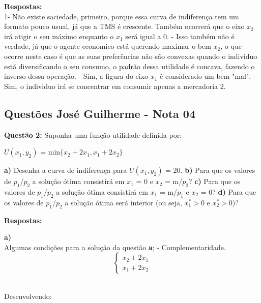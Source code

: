 \begin{flushleft}
\textbf{Respostas:}
\\
1- Não existe saciedade, primeiro, porque essa curva de indiferença tem um formato pouco usual, já que a TMS é crescente. Também ocorrerá que o eixo $x_2$ irá atigir o seu máximo enquanto o $x_1$ será igual a 0.
- Isso também não é verdade, já que o agente economico está querendo maximar o bem $x_2$, o que ocorre neste caso é que as suas preferências não são convexas quando o individuo está diversificando o seu consumo, o padrão dessa utilidade é concava, fazendo o inverso dessa operação.
- Sim, a figura do eixo $x_1$ é considerado um bem "mal".
- Sim, o individuo irá se concentrar em consumir apenas a mercadoria 2.
\singlespacing


\begin{center}
	\section*{Questões José Guilherme - Nota 04}
\end{center}
\singlespacing

\textbf{Questão 2:} Suponha uma função utilidade definida por:

\begin{center}
	$U(x_{1}, y_{2})$ = min$\lbrace{x_{2} + 2x_{1},x_{1} + 2x_{2} }\rbrace$

\end{center}

\textbf{a)} Desenha a curva de indiferença para $U(x_{1}, y_{2})$ = 20.
\singlespacing
\textbf{b)} Para que os valores de $p_{1}$/$p_{2}$ a solução ótima consistirá em $x_{1}$ = 0 e $x_{2}$ = m/$p_{2}$?
\singlespacing
\textbf{c)} Para que os valores de $p_{1}$/$p_{2}$ a solução ótima consistirá em $x_{1}$ = m/$p_{1}$ e $x_{2}$ = 0? 
\singlespacing
\textbf{d)} Para que os valores de $p_{1}$/$p_{2}$ a solução ótima será interior (ou seja, $x_{1}^{*} >0$ e $x_{2}^{*}>0$)?
\singlespacing

\textbf{Respostas:}
\singlespacing

\textbf{a)} \\
	Algumas condições para a solução da questão \textbf{a};
	 - Complementaridade.
	\singlespacing
	   \begin{equation} \label{eq:1}
		\left\{
		\begin{array}{ll}
		x_{2} + 2x_{1} \\
		x_{1} + 2x_{2}
		\end{array}
		\right.
		\end{equation}
\\
		\begin{center}
			Desenvolvendo:
		\end{center}



\end{flushleft}
